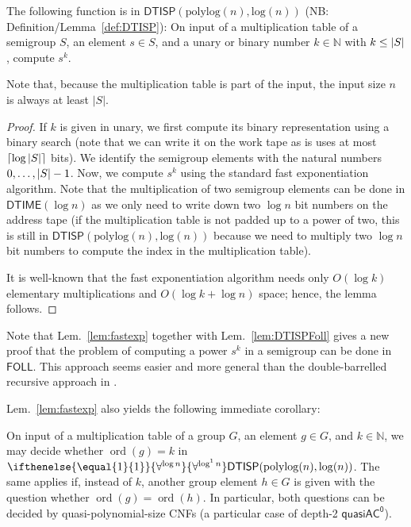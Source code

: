 \documentclass{theoretics}
\newcommand{\ord}[1]{\operatorname{ord}(#1)}
\newcommand{\alphacc}[1]{\ifthenelse{\equal{#1}{1}}{\forall^{\log n}}{\forall^{\log^{#1}n}}} %
\newcommand{\Oh}{O}
\newcommand{\N}{\mathbb{N}}
\newcommand{\abs}[1]{\left|\mathinner{#1}\right|}
\newcommand{\ceil}[1]{\left\lceil\mathinner{#1}\right\rceil}
\newcommand{\Lem}[1]{Lem.~\ref{#1}\xspace}
\newcommand*{\ComplexityClass}[1]{\ensuremath{\mathsf{#1}}\xspace}
\newcommand{\DTISP}{\ComplexityClass{DTISP}}
\newcommand{\DTISPpll}{\ensuremath{\DTISP(\mathrm{polylog}(n),\mathrm{log}(n))}\xspace}
\newcommand{\qACz}{\ComplexityClass{quasiAC^0}}
\newcommand{\FOLL}{\ComplexityClass{FOLL}}
\newcommand{\DTIME}{\ComplexityClass{DTIME}}
\begin{document}
\begin{lemma}\label{lem:fastexp}
    The following function is in $\DTISPpll$ (NB: Definition/Lemma~\ref{def:DTISP}):
    On input of a multiplication table of a semigroup $S$, an element $s \in S$, and a unary or binary number $k \in \N$ with $k \leq \abs{S}$, compute $s^k$. 
\end{lemma}

Note that, because the multiplication table is part of the input, the input size $n$ is always at least $|S|$.

\begin{proof}
    If $k$ is given in unary, we first compute its binary representation using a binary search (note that we can write it on the work tape as is uses at most $\ceil{\log\abs{S}}$ bits). We identify the semigroup elements with the natural numbers $0, \dots, \abs{S}-1$.
    Now, we compute $s^k$ using the standard fast exponentiation algorithm. Note that the multiplication of two semigroup elements can be done in $\DTIME(\log n)$ as we only need to write down two $\log n$ bit numbers on the address tape (if the multiplication table is not padded up to a power of two, this is still in $\DTISPpll$ because we need to multiply two $\log n$ bit numbers to compute the index in the multiplication table). 

    It is well-known that the fast exponentiation algorithm needs only $\Oh(\log k)$ elementary multiplications and $O(\log k + \log n)$ space; hence, the lemma follows.
\end{proof}


Note that \Lem{lem:fastexp} together with \Lem{lem:DTISPFoll} gives a new proof that the problem of computing a power $s^k$ in a semigroup can be done in \FOLL. This approach seems easier and more general than the double-barrelled recursive approach in \cite{BKLM}.

\Lem{lem:fastexp} also yields the following immediate corollary:

\begin{corollary} \label{cor:fastexp}\label{lem:order_finding}
On input of a multiplication table of a group $G$, an element $g \in G$, and $k \in \N$, we may decide whether  $\ord{g} = k$ in $\alphacc{1}\DTISPpll$. The same applies if, instead of $k$, another group element $h\in G$ is given with the question whether $\ord{g} = \ord{h}$. In particular, both questions can be decided by quasi-polynomial-size CNFs (a particular case of depth-2 $\qACz$).
\end{corollary}
\end{document}
